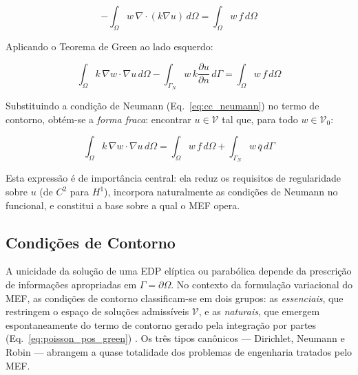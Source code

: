 \begin{equation}
-\int_\Omega w \, \nabla \cdot (k \nabla u) \, d\Omega = \int_\Omega w \, f \, d\Omega
\label{eq:poisson_pre_green}
\end{equation}

Aplicando o Teorema de Green ao lado esquerdo:

\begin{equation}
\int_\Omega k \, \nabla w \cdot \nabla u \, d\Omega - \int_{\Gamma_N} w \, k \frac{\partial u}{\partial n} \, d\Gamma = \int_\Omega w \, f \, d\Omega
\label{eq:poisson_pos_green}
\end{equation}

Substituindo a condição de Neumann (Eq.~\ref{eq:cc_neumann}) no termo de contorno, obtém-se a \textit{forma fraca}: encontrar $u \in \mathcal{V}$ tal que, para todo $w \in \mathcal{V}_0$:

\begin{equation}
\boxed{\int_\Omega k \, \nabla w \cdot \nabla u \, d\Omega = \int_\Omega w \, f \, d\Omega + \int_{\Gamma_N} w \, \bar{q} \, d\Gamma}
\label{eq:forma_fraca_poisson}
\end{equation}

Esta expressão é de importância central: ela reduz os requisitos de regularidade sobre $u$ (de $C^2$ para $H^1$), incorpora naturalmente as condições de Neumann no funcional, e constitui a base sobre a qual o MEF opera.

\subsection{Condições de Contorno}
\label{sec:condicoes_contorno}

A unicidade da solução de uma EDP elíptica ou parabólica depende da prescrição de informações apropriadas em $\Gamma = \partial\Omega$. No contexto da formulação variacional do MEF, as condições de contorno classificam-se em dois grupos: as \textit{essenciais}, que restringem o espaço de soluções admissíveis $\mathcal{V}$, e as \textit{naturais}, que emergem espontaneamente do termo de contorno gerado pela integração por partes (Eq.~\ref{eq:poisson_pos_green}) \cite{Reddy2005}. Os três tipos canônicos --- Dirichlet, Neumann e Robin --- abrangem a quase totalidade dos problemas de engenharia tratados pelo MEF.

